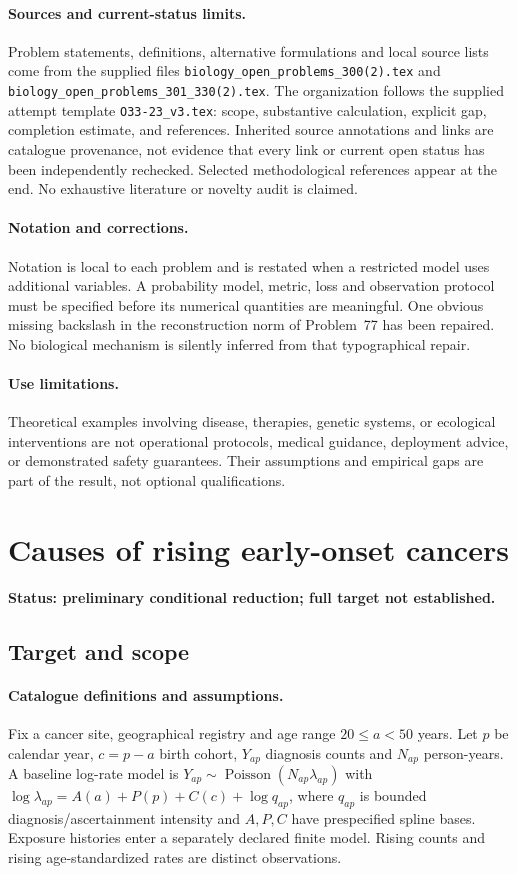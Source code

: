 \documentclass[11pt]{article}
\begin{document}
\paragraph{Sources and current-status limits.}
Problem statements, definitions, alternative formulations and local source lists
come from the supplied files
\texttt{biology\_open\_problems\_300(2).tex} and
\texttt{biology\_open\_problems\_301\_330(2).tex}.
The organization follows the supplied attempt template
\texttt{O33-23\_v3.tex}: scope, substantive calculation, explicit gap,
completion estimate, and references. Inherited source annotations and links are
catalogue provenance, not evidence that every link or current open status has
been independently rechecked. Selected methodological references appear at the
end. No exhaustive literature or novelty audit is claimed.

\paragraph{Notation and corrections.}
Notation is local to each problem and is restated when a restricted model uses
additional variables. A probability model, metric, loss and observation protocol
must be specified before its numerical quantities are meaningful. One obvious
missing backslash in the reconstruction norm of Problem~77 has been repaired.
No biological mechanism is silently inferred from that typographical repair.

\paragraph{Use limitations.}
Theoretical examples involving disease, therapies, genetic systems, or ecological
interventions are not operational protocols, medical guidance, deployment advice,
or demonstrated safety guarantees. Their assumptions and empirical gaps are part
of the result, not optional qualifications.


\section*{Causes of rising early-onset cancers}
\label{prob:246}
\noindent\textbf{Status: preliminary conditional reduction; full target not established.}
\subsection{Target and scope}
\paragraph{Catalogue definitions and assumptions.}
Fix a cancer site, geographical registry and age range $20\leq a<50$ years. Let $p$ be calendar year, $c=p-a$ birth cohort, $Y_{ap}$ diagnosis counts and $N_{ap}$ person-years. A baseline log-rate model is $Y_{ap}\sim\operatorname{Poisson}(N_{ap}\lambda_{ap})$ with $\log\lambda_{ap}=A(a)+P(p)+C(c)+\log q_{ap}$, where $q_{ap}$ is bounded diagnosis/ascertainment intensity and $A,P,C$ have prespecified spline bases. Exposure histories enter a separately declared finite model. Rising counts and rising age-standardized rates are distinct observations.
\end{document}

